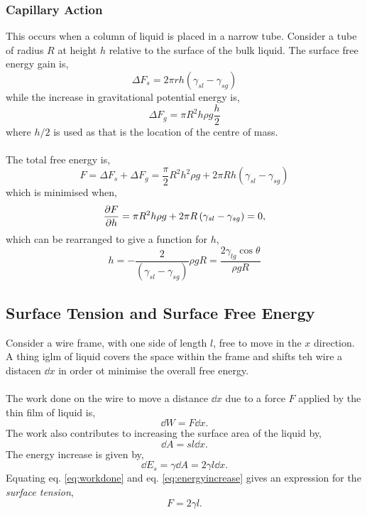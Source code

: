 \documentclass{book}
\begin{document}
\subsubsection{Capillary Action}
This occurs when a column of liquid is placed in a narrow tube. Consider a tube of radius $R$ at height $h$ relative to the surface of the bulk liquid. The surface free energy gain is,
\begin{equation}
	\Delta F_s = 2\pi r h \left(\gamma_{sl} - \gamma_{sg}\right)
\end{equation}
while the increase in gravitational potential energy is,
\begin{equation}
	\Delta F_g = \pi R^2 h \rho g \frac{h}{2}
\end{equation}
where $h/2$ is used as that is the location of the centre of mass.\\\\
The total free energy is,
\begin{equation}
	F = \Delta F_s + \Delta F_g = \frac{\pi}{2}R^2h^2\rho g + 2\pi Rh \left(\gamma_{sl} - \gamma_{sg}\right)
\end{equation}
which is minimised when,
\begin{equation}
	\pdv{F}{h} = \pi R^2 h \rho g + 2\pi R\left(\gamma_{sl} - \gamma_{sg}\right) = 0,
\end{equation}
which can be rearranged to give a function for $h$,
\begin{equation}
	\boxed{h = -\frac{2}{(\gamma_{sl} - \gamma_{sg})}{\rho g R} = \frac{2\gamma_{lg} \cos\theta}{\rho g R}}
\end{equation}
\subsection{Surface Tension and Surface Free Energy}
Consider a wire frame, with one side of length $l$, free to move in the $x$ direction. A thing iglm of liquid covers the space within the frame and shifts teh wire a distacen $\dd{x}$ in order ot minimise the overall free energy.\\\\
The work done on the wire to move a distance $\dd{x}$ due to a force $F$ applied by the thin film of liquid is,
\begin{equation}
	\dd{W} = F\dd{x}. \label{eq:workdone}
\end{equation}
The work also contributes to increasing the surface area of the liquid by,
\begin{equation}
	\dd{A} = sl \dd{x}.
\end{equation}
The energy increase is given by,
\begin{equation}
	\dd{E}_s = \gamma \dd{A} = 2\gamma l \dd{x}.\label{eq:energyincrease}
\end{equation}
Equating eq. \eqref{eq:workdone} and eq. \eqref{eq:energyincrease} gives an expression for the \textit{surface tension},
\begin{equation}
	\boxed{F = 2\gamma l}.
\end{equation}
\end{document}
